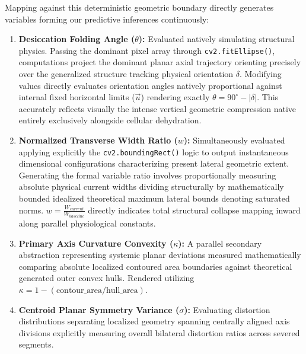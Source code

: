 \documentclass[conference]{IEEEtran}
\begin{document}
Mapping against this deterministic geometric boundary directly generates variables forming our predictive inferences continuously:
\begin{enumerate}
    \item \textbf{Desiccation Folding Angle ($\theta$):} Evaluated natively simulating structural physics. Passing the dominant pixel array through \texttt{cv2.fitEllipse()}, computations project the dominant planar axial trajectory orienting precisely over the generalized structure tracking physical orientation $\delta$. Modifying values directly evaluates orientation angles natively proportional against internal fixed horizontal limits ($\vec{u}$) rendering exactly $\theta = 90^\circ - |\delta|$. This accurately reflects visually the intense vertical geometric compression native entirely exclusively alongside cellular dehydration.
    \item \textbf{Normalized Transverse Width Ratio ($w$):} Simultaneously evaluated applying explicitly the \texttt{cv2.boundingRect()} logic to output instantaneous dimensional configurations characterizing present lateral geometric extent. Generating the formal variable ratio involves proportionally measuring absolute physical current widths dividing structurally by mathematically bounded idealized theoretical maximum lateral bounds denoting saturated norms. $w = \frac{W_{current}}{W_{baseline}}$ directly indicates total structural collapse mapping inward along parallel physiological constants. 
    \item \textbf{Primary Axis Curvature Convexity ($\kappa$):} A parallel secondary abstraction representing systemic planar deviations measured mathematically comparing absolute localized contoured area boundaries against theoretical generated outer convex hulls. Rendered utilizing $\kappa = 1 - (\text{contour\_area} / \text{hull\_area})$.
    \item \textbf{Centroid Planar Symmetry Variance ($\sigma$):} Evaluating distortion distributions separating localized geometry spanning centrally aligned axis divisions explicitly measuring overall bilateral distortion ratios across severed segments.
\end{enumerate}
\end{document}
